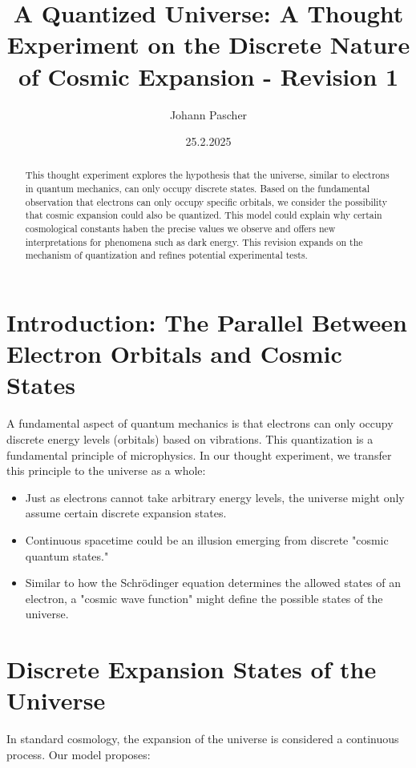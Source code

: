 \documentclass[12pt,a4paper]{article}
\title{A Quantized Universe: A Thought Experiment on the Discrete Nature of Cosmic Expansion - Revision 1}
\author{Johann Pascher}
\date{25.2.2025}
\begin{document}
	
	\maketitle
	
	\tableofcontents
	
	\begin{abstract}
		This thought experiment explores the hypothesis that the universe, similar to electrons in quantum mechanics, can only occupy discrete states. Based on the fundamental observation that electrons can only occupy specific orbitals, we consider the possibility that cosmic expansion could also be quantized. This model could explain why certain cosmological constants haben the precise values we observe and offers new interpretations for phenomena such as dark energy. This revision expands on the mechanism of quantization and refines potential experimental tests.
	\end{abstract}
	
	\section{Introduction: The Parallel Between Electron Orbitals and Cosmic States}
	
	A fundamental aspect of quantum mechanics is that electrons can only occupy discrete energy levels (orbitals) based on vibrations. This quantization is a fundamental principle of microphysics. In our thought experiment, we transfer this principle to the universe as a whole:
	
	\begin{itemize}
		\item Just as electrons cannot take arbitrary energy levels, the universe might only assume certain discrete expansion states.
		\item Continuous spacetime could be an illusion emerging from discrete "cosmic quantum states."
		\item Similar to how the Schr\"odinger equation determines the allowed states of an electron, a "cosmic wave function" might define the possible states of the universe.
	\end{itemize}
	
	\section{Discrete Expansion States of the Universe}
	
	In standard cosmology, the expansion of the universe is considered a continuous process. Our model proposes:
	
\end{document}
